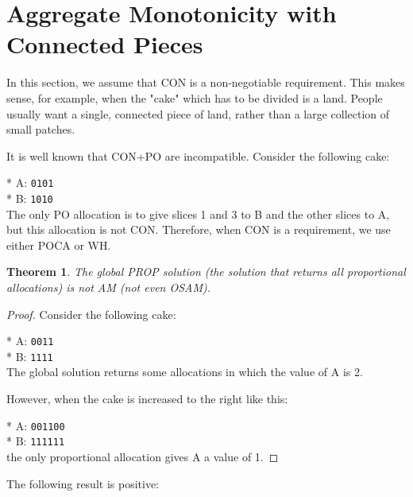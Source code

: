 \documentclass[a4paper,12pt]{article}
\newcommand{\biexample}[2]{
* \hspace{1cm}   A: \texttt{#1} \\
* \hspace{1cm}   B: \texttt{#2} \\
}
\newtheorem{thm}{Theorem}[section]
\begin{document}
\section{Aggregate Monotonicity with Connected Pieces}
In this section, we assume that CON is a non-negotiable requirement. This makes sense, for example, when the "cake" which has to be divided is a land. People usually want a single, connected piece of land, rather than a large collection of small patches.

It is well known that CON+PO are incompatible. Consider the following cake:

\biexample{0101}{1010}

The only PO allocation is to give slices 1 and 3 to B and the other slices to A, but this allocation is not CON. Therefore, when CON is a requirement, we use either POCA or WH.

\begin{thm}
The global PROP solution (the solution that returns all proportional allocations) is not AM (not even OSAM).
\end{thm}
\begin{proof}
Consider the following cake:

\biexample{0011}{1111}

The global solution returns some allocations in which the value of A is 2.

However, when the cake is increased to the right like this:

\biexample{001100}{111111}

the only proportional allocation gives A a value of 1.
\end{proof}


The following result is positive:
\end{document}
